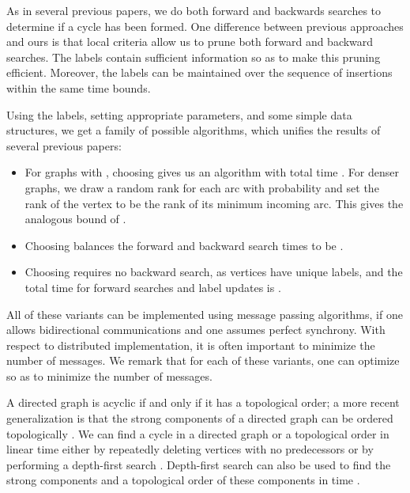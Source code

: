\documentclass[11pt]{article}
\theoremstyle{plain}
\theoremstyle{definition}
\theoremstyle{remark}
\numberwithin{equation}{section}
\begin{document}
As in several previous papers, we do both forward and backwards
searches to determine if a cycle has been formed. One difference
between previous approaches and ours is that local criteria allow us
to prune both forward and backward searches. The labels contain
sufficient information so as to make this pruning efficient.
Moreover, the labels can be maintained over the sequence of insertions within the same
time bounds.



Using the labels, setting appropriate parameters, and some simple
data structures, we get a family of possible algorithms, which
unifies the results of several previous papers:

\begin{itemize}
\item For graphs with , choosing  gives us an algorithm with total time .
For denser graphs, we draw a random rank for each arc with
probability  and set the rank of the vertex to be the
rank of its minimum incoming arc. This gives the analogous bound of
.

\item Choosing  balances the forward and backward search times to be .
\item Choosing  requires no backward search, as vertices have
  unique labels, and the total time for forward searches and label updates is .

\end{itemize}

All of these variants can be implemented using message passing
algorithms, if one allows bidirectional communications and one
assumes perfect synchrony. With respect to distributed
implementation, it is often important to minimize the number of
messages.
 We remark that for each of these
variants, one can optimize  so as to minimize the number of
messages.






\smallskip
{}

A directed graph is acyclic if and only if it has a topological
order; a more recent generalization is that the strong components of
a directed graph can be ordered topologically
\cite{harary1965structural}. We can find a cycle in a directed graph
or a topological order in linear time either by repeatedly deleting
 vertices with no
predecessors \cite{KnuthS74} or by performing a depth-first search
\cite{Tarjan72dfs}. Depth-first search can also be used to find the
strong components and a topological order of these components in
 time \cite{Tarjan72dfs}.
\end{document}
